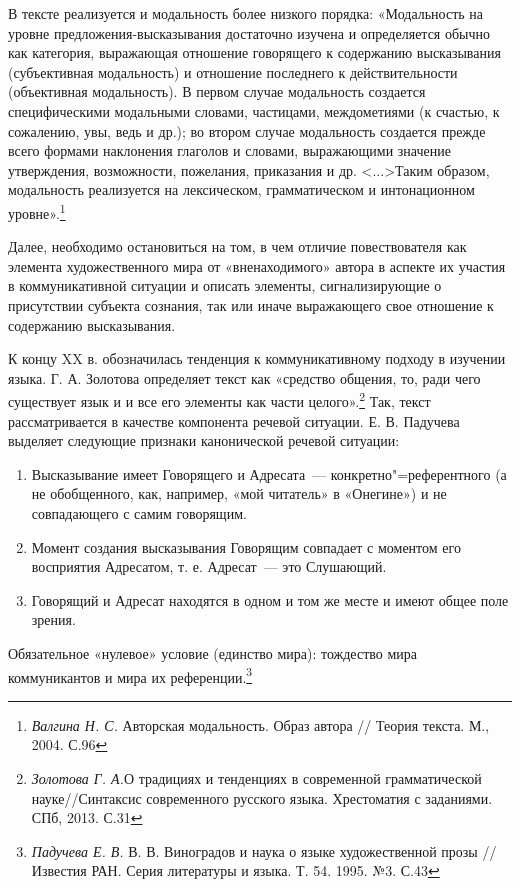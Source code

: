 \documentclass{kursa4}
\begin{document}
      В тексте реализуется и модальность более низкого порядка: «Модальность на уровне предложения-высказывания достаточно изучена и определяется обычно как категория, выражающая отношение говорящего к содержанию высказывания (субъективная модальность) и отношение последнего к действительности (объективная модальность). В первом случае модальность создается специфическими модальными словами, частицами, междометиями (к счастью, к сожалению, увы, ведь и др.); во втором случае модальность создается прежде всего формами наклонения глаголов и словами, выражающими значение утверждения, возможности, пожелания, приказания и др. \textless{}...\textgreater{}Таким образом, модальность реализуется на лексическом, грамматическом и интонационном уровне».\footnote{\textit{{Валгина Н. С. }}{Авторская модальность. Образ автора // Теория текста. М., 2004. С.96}} 

      Далее, необходимо остановиться на том, в чем отличие повествователя как элемента художественного мира от «вненаходимого» автора в аспекте их участия в коммуникативной ситуации и описать элементы, сигнализирующие о присутствии субъекта сознания, так или иначе выражающего свое отношение к содержанию высказывания. 

      К концу XX в. обозначилась тенденция к коммуникативному подходу в изучении языка. Г. А. Золотова определяет текст как «средство общения, то, ради чего существует язык и и все его элементы как части целого».\footnote{\textit{Золотова Г. А.}О традициях и тенденциях в современной грамматической науке//Синтаксис современного русского языка. Хрестоматия с заданиями. СПб, 2013. С.31} Так, текст рассматривается в качестве компонента речевой ситуации. \newline
      Е. В. Падучева выделяет следующие признаки канонической речевой ситуации: 

      \begin{enumerate}
      \item Высказывание имеет Говорящего и Адресата~--- конкретно"=референтного (а не обобщенного, как, например, «мой читатель» в «Онегине») и не совпадающего с самим говорящим. 
      \item Момент создания высказывания Говорящим совпадает с моментом его восприятия Адресатом, т. е. Адресат~--- это Слушающий. 
      \item Говорящий и Адресат находятся в одном и том же месте и имеют общее поле зрения. 
      \end{enumerate}
      Обязательное «нулевое» условие (единство мира): тождество мира коммуникантов и мира их референции.\footnote{\textit{Падучева Е. В. }В. В. Виноградов и наука о языке художественной прозы // Известия РАН. Серия литературы и языка. Т. 54. 1995. №3. С.43} 
\end{document}
